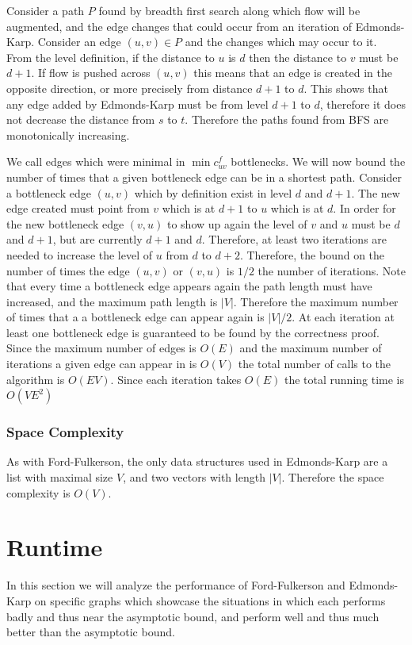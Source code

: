 \documentclass{article}
\begin{document}
Consider a path $P$ found by breadth first search along which flow will be augmented, and the edge changes that could occur from an iteration of Edmonds-Karp. Consider an edge $(u,v)\in P$ and the changes which may occur to it. From the level definition, if the distance to $u$ is $d$ then the distance to $v$ must be $d+1$. If flow is pushed across $(u,v)$ this means that an edge is created in the opposite direction, or more precisely from distance $d+1$ to $d$. This shows that any edge added by Edmonds-Karp must be from level $d+1$ to $d$, therefore it does not decrease the distance from $s$ to $t$. Therefore the paths found from BFS are monotonically increasing.

We call edges which were minimal in $\min c_{uv}^f$ bottlenecks. We will now bound the number of times that a given bottleneck edge can be in a shortest path. Consider a bottleneck edge $(u,v)$ which by definition exist in level $d$ and $d+1$. The new edge created must point from $v$ which is at $d+1$ to $u$ which is at $d$. In order for the new bottleneck edge $(v,u)$ to show up again the level of  $v$ and $u$ must be $d$ and $d+1$, but are currently $d+1$ and $d$. Therefore, at least two iterations are needed to increase the level of $u$ from $d$ to $d+2$. Therefore, the bound on the number of times the edge $(u,v)$ or $(v,u)$ is $1/2$ the number of iterations. Note that every time a bottleneck edge appears again the path length must have increased, and the maximum path length is $|V|$. Therefore the maximum number of times that a a bottleneck edge can appear again is $|V|/2$. At each iteration at least one bottleneck edge is guaranteed to be found by the correctness proof. Since the maximum number of edges is $O(E)$ and the maximum number of iterations a given edge can appear in is $O(V)$ the total number of calls to the algorithm is $O(EV)$. Since each iteration takes $O(E)$ the total running time is $O(VE^2)$


\subsubsection{Space Complexity}
As with Ford-Fulkerson, the only data structures used in Edmonds-Karp are a list with maximal size $V$, and two vectors with length $|V|$. Therefore the space complexity is $O(V)$.

\section{Runtime}
In this section we will analyze the performance of Ford-Fulkerson and Edmonds-Karp on specific graphs which showcase the situations in which each performs badly and thus near the asymptotic bound, and perform well and thus much better than the asymptotic bound.
\end{document}
